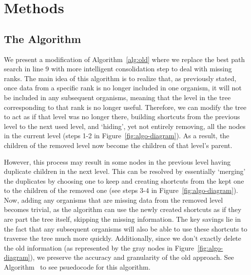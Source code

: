 \section{Methods} \label{sec:methods}



\subsection{The Algorithm} \label{sec:algorithm}

We present a modification of Algorithm~\ref{alg:old} where we replace the best path search in line 9 with more intelligent consolidation step to deal with missing ranks. The main idea of this algorithm is to realize that, as previously stated, once data from a specific rank is no longer included in one organism, it will not be included in any subsequent organisms, meaning that the level in the tree corresponding to that rank is no longer useful. Therefore, we can modify the tree to act as if that level was no longer there, building shortcuts from the previous level to the next used level, and `hiding', yet not entirely removing, all the nodes in the current level (steps 1-2 in Figure~\ref{fig:algo-diagram}). As a result, the children of the removed level now become the children of that level's parent. 



However, this process may result in some nodes in the previous level having duplicate children in the next level. This can be resolved by essentially `merging' the duplicates by choosing one to keep and creating shortcuts from the kept one to the children of the removed one (see steps 3-4 in Figure~\ref{fig:algo-diagram}). Now, adding any organisms that are missing data from the removed level becomes trivial, as the algorithm can use the newly created shortcuts as if they are part the tree itself, skipping the missing information. The key savings lie in the fact that any subsequent organisms will also be able to use these shortcuts to traverse the tree much more quickly. Additionally, since we don't exactly delete the old information (as represented by the gray nodes in Figure~\ref{fig:algo-diagram}), we preserve the accuracy and granularity of the old approach. See Algorithm~ to see psuedocode for this algorithm.



